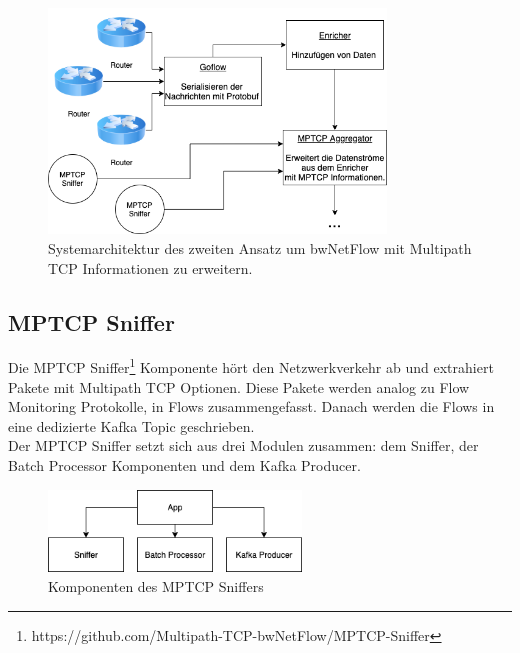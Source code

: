 \documentclass[a4paper, 12pt]{article}
\begin{document}
\begin{figure}[H]
    \centering
    \includegraphics[width=0.8\textwidth]{images/extendedbwnetflow.png}
    \caption{Systemarchitektur des zweiten Ansatz um bwNetFlow mit Multipath TCP Informationen zu erweitern.}
    \label{fig:sniffer_component}
\end{figure}

\subsection{MPTCP Sniffer}
Die MPTCP Sniffer\footnote{https://github.com/Multipath-TCP-bwNetFlow/MPTCP-Sniffer} Komponente hört den Netzwerkverkehr ab und extrahiert Pakete mit Multipath TCP Optionen.
Diese Pakete werden analog zu Flow Monitoring Protokolle, in Flows zusammengefasst.
Danach werden die Flows in eine dedizierte Kafka Topic geschrieben.
\\
Der MPTCP Sniffer setzt sich aus drei Modulen zusammen: dem Sniffer, der Batch Processor Komponenten und dem Kafka Producer.

\begin{figure}[H]
    \centering
    \includegraphics[width=0.6\textwidth]{images/sniffer_component.png}
    \caption{Komponenten des MPTCP Sniffers}
    \label{fig:sniffer_component}
\end{figure}
\end{document}
